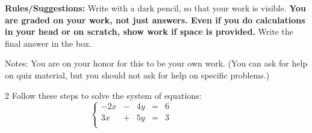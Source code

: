 \documentclass[11pt,addpoints,answers]{exam}
\newcommand{\+}{\, \, + \, \, }
\renewcommand{\-}{\, \, - \, \, }
\renewcommand{\=}{\, \, = \, \, }
\begin{document}


{\small \noindent \textbf{Rules/Suggestions:} Write with a dark pencil, so that your work is visible.  \textbf{You are graded on your work, not just answers. Even if you do calculations in your head or on scratch, show work if space is provided. } Write the final answer in the box.

Notes: You are on your honor for this to be your own work.  (You can ask for help on quiz material, but you should not ask for help on specific problems.) }
\begin{questions}


\setlength\columnsep{2cm}

\begin{multicols}{2}
\question Follow these steps to solve the system of equations:
\columnbreak
\begin{equation*}
\left\{
\begin{alignedat}{3}
-2x & {}-{} & 4y & {}={} & 6\quad\quad\quad\quad\quad\quad\\
3x & {}+{} &5y &  {}={} & 3 \quad\quad\quad\quad\quad\quad\\
\end{alignedat}
\right.\end{equation*}
\end{multicols}

\end{questions}
\end{document}
